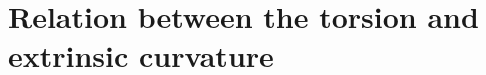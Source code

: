 \documentclass[
10pt, %
a4paper, %
oneside, %
headinclude,footinclude, %
BCOR5mm, %
]{scrartcl}
\newcommand{\IP}[1]{{\color{Red}[IP:\ \ #1]}}
\newcommand{\sA}{\mathsmaller A}
\newcommand{\sB}{\mathsmaller B}
\newcommand{\pd}[1]{\partial_{#1}}
\newcommand{\MG}[1]{\kappa^{#1}}			%
\newcommand{\tetrsymbol}{h}
\newcommand{\itetrsymbol}{\eta}
\newcommand{\itetr}[2]{\itetrsymbol^{#1}_{\phantom{#1}#2}}
\newcommand{\detTetr}{\tetrsymbol}
\newcommand{\Dfin}[2]{\mathtt{D}_{\phantom{#2}#1}^{#2}}	%
\newcommand{\Hfin}[2]{\mathtt{H}_{#2#1}}	%
\newcommand{\Efin}[2]{\mathtt{E}^{#1}_{\phantom{#1}#2}}	%
\newcommand{\Hfinn}[2]{\hat{\mathtt{H}}_{{#2}{#1}}}	%
\newcommand{\Efinn}[2]{\hat{\mathtt{E}}^{#1}_{\ #2}}	%
\newcommand{\Bfin}[2]{\mathtt{B}^{#1#2}}	%
\newcommand{\LCsymb}{\bm{\in}}    %
\newcommand{\indalg}[1]{\hat{\mathsmaller{#1}}}
\newcommand{\shift}[1]{\beta^{#1}}
\begin{document}
%
%
%
%




\section{Relation between the torsion and extrinsic curvature}
\end{document}
